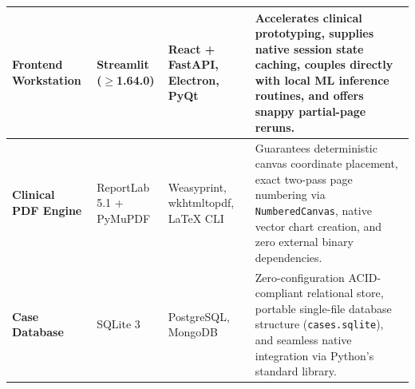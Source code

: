 \begin{table}[htbp]
\begin{tabular}{P{2.5cm}P{3.2cm}P{3.5cm}P{4cm}}
\midrule
\textbf{Frontend Workstation} & Streamlit ($\geq$1.64.0) & React + FastAPI, Electron, PyQt & Accelerates clinical prototyping, supplies native session state caching, couples directly with local ML inference routines, and offers snappy partial-page reruns. \\
\midrule
\textbf{Clinical PDF Engine} & ReportLab 5.1 + PyMuPDF & Weasyprint, wkhtmltopdf, LaTeX CLI & Guarantees deterministic canvas coordinate placement, exact two-pass page numbering via \texttt{NumberedCanvas}, native vector chart creation, and zero external binary dependencies. \\
\midrule
\textbf{Case Database} & SQLite 3 & PostgreSQL, MongoDB & Zero-configuration ACID-compliant relational store, portable single-file database structure (\texttt{cases.sqlite}), and seamless native integration via Python's standard library. \\
\bottomrule
\end{tabular}
\end{table}
